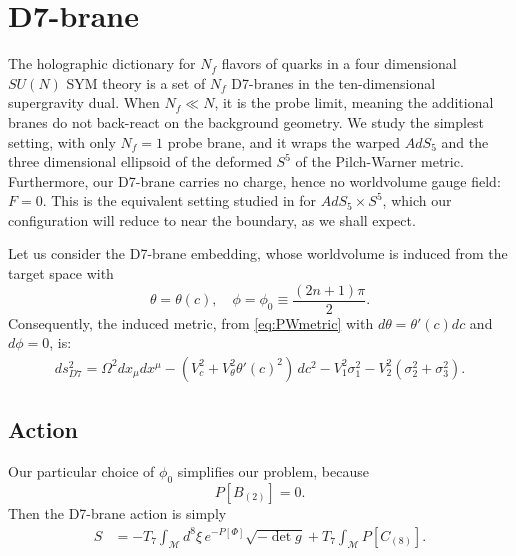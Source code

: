 \section{D7-brane}\label{sec:D7brane}

The holographic dictionary for $N_f$ flavors of quarks in a four dimensional $SU(N)$ SYM theory is a set of $N_f$ D7-branes in the ten-dimensional supergravity dual. When $N_f \ll N$, it is the probe limit, meaning the additional branes do not back-react on the background geometry. 
We study the simplest setting, with only $N_f=1$ probe brane, and it wraps the warped $AdS_5$ and the three dimensional ellipsoid of the deformed $S^5$ of the Pilch-Warner metric. Furthermore, our D7-brane carries no charge, hence no worldvolume gauge field: $F = 0$. This is the equivalent setting studied in \cite{Karch:2002sh} for $AdS_5 \times S^5$, which our configuration will reduce to near the boundary, as we shall expect.


Let us consider the D7-brane embedding, whose worldvolume is induced from the target space with 
\begin{equation}\label{eq:ansatz}
 \theta = \theta(c), \quad \phi=\phi_0\equiv\frac{(2 n + 1)\pi}{2}.
\end{equation}
Consequently, the induced metric, from \eqref{eq:PWmetric} with $d\theta = \theta'(c) dc$ and $d\phi=0$, is:
\begin{align}\label{eq:PWmetric}
ds_{D7}^2 =
\Omega^2 dx_\mu dx^\mu 
- (V_c^2 +V_\theta^2 \theta'(c)^2)\, dc^2 - V_1^2 \sigma_1^2 - V_2^2 (\sigma_2^2 + \sigma_3^2).
\end{align}


\subsection{Action}

Our particular choice of $\phi_0$ simplifies our problem, because
\begin{equation}
 P[B_{(2)}] = 0.
\end{equation}
Then the D7-brane action is simply
\begin{align}
 S & = -T_7 \int_\mathcal{M} d^8\xi \, e^{-P[\Phi] } \sqrt{-\det g} +
 T_7\int _\mathcal{M} P[C_{(8)}].
\end{align}

